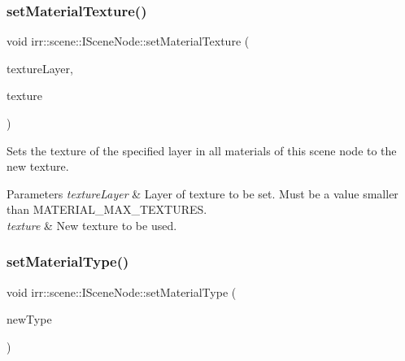 \subsubsection{\texorpdfstring{set\+Material\+Texture()}{setMaterialTexture()}}
{\footnotesize\ttfamily void irr\+::scene\+::\+I\+Scene\+Node\+::set\+Material\+Texture (\begin{DoxyParamCaption}\item[{\hyperlink{namespaceirr_a0416a53257075833e7002efd0a18e804}{u32}}]{texture\+Layer,  }\item[{\hyperlink{classirr_1_1video_1_1ITexture}{video\+::\+I\+Texture} $\ast$}]{texture }\end{DoxyParamCaption})\hspace{0.3cm}{\ttfamily [inline]}}



Sets the texture of the specified layer in all materials of this scene node to the new texture. 


\begin{DoxyParams}{Parameters}
{\em texture\+Layer} & Layer of texture to be set. Must be a value smaller than M\+A\+T\+E\+R\+I\+A\+L\+\_\+\+M\+A\+X\+\_\+\+T\+E\+X\+T\+U\+R\+ES. \\
\hline
{\em texture} & New texture to be used. \\
\hline
\end{DoxyParams}
\mbox{\label{classirr_1_1scene_1_1ISceneNode_a302c7dedd776b52111823df5ed8446de}} 
\subsubsection{\texorpdfstring{set\+Material\+Type()}{setMaterialType()}}
{\footnotesize\ttfamily void irr\+::scene\+::\+I\+Scene\+Node\+::set\+Material\+Type (\begin{DoxyParamCaption}\item[{\hyperlink{namespaceirr_1_1video_ac8e9b6c66f7cebabd1a6d30cbc5430f1}{video\+::\+E\+\_\+\+M\+A\+T\+E\+R\+I\+A\+L\+\_\+\+T\+Y\+PE}}]{new\+Type }\end{DoxyParamCaption})\hspace{0.3cm}{\ttfamily [inline]}}



